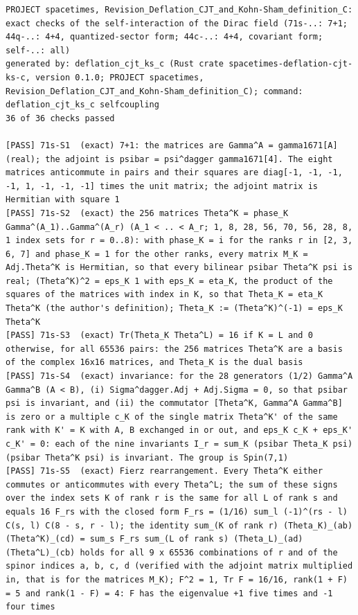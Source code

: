 \documentclass[
  10pt,
]{article}
\begin{document}
\begin{verbatim}
PROJECT spacetimes, Revision_Deflation_CJT_and_Kohn-Sham_definition_C: exact checks of the self-interaction of the Dirac field (71s-..: 7+1; 44q-..: 4+4, quantized-sector form; 44c-..: 4+4, covariant form; self-..: all)
generated by: deflation_cjt_ks_c (Rust crate spacetimes-deflation-cjt-ks-c, version 0.1.0; PROJECT spacetimes, Revision_Deflation_CJT_and_Kohn-Sham_definition_C); command: deflation_cjt_ks_c selfcoupling
36 of 36 checks passed

[PASS] 71s-S1  (exact) 7+1: the matrices are Gamma^A = gamma1671[A] (real); the adjoint is psibar = psi^dagger gamma1671[4]. The eight matrices anticommute in pairs and their squares are diag[-1, -1, -1, -1, 1, -1, -1, -1] times the unit matrix; the adjoint matrix is Hermitian with square 1
[PASS] 71s-S2  (exact) the 256 matrices Theta^K = phase_K Gamma^(A_1)..Gamma^(A_r) (A_1 < .. < A_r; 1, 8, 28, 56, 70, 56, 28, 8, 1 index sets for r = 0..8): with phase_K = i for the ranks r in [2, 3, 6, 7] and phase_K = 1 for the other ranks, every matrix M_K = Adj.Theta^K is Hermitian, so that every bilinear psibar Theta^K psi is real; (Theta^K)^2 = eps_K 1 with eps_K = eta_K, the product of the squares of the matrices with index in K, so that Theta_K = eta_K Theta^K (the author's definition); Theta_K := (Theta^K)^(-1) = eps_K Theta^K
[PASS] 71s-S3  (exact) Tr(Theta_K Theta^L) = 16 if K = L and 0 otherwise, for all 65536 pairs: the 256 matrices Theta^K are a basis of the complex 16x16 matrices, and Theta_K is the dual basis
[PASS] 71s-S4  (exact) invariance: for the 28 generators (1/2) Gamma^A Gamma^B (A < B), (i) Sigma^dagger.Adj + Adj.Sigma = 0, so that psibar psi is invariant, and (ii) the commutator [Theta^K, Gamma^A Gamma^B] is zero or a multiple c_K of the single matrix Theta^K' of the same rank with K' = K with A, B exchanged in or out, and eps_K c_K + eps_K' c_K' = 0: each of the nine invariants I_r = sum_K (psibar Theta_K psi)(psibar Theta^K psi) is invariant. The group is Spin(7,1)
[PASS] 71s-S5  (exact) Fierz rearrangement. Every Theta^K either commutes or anticommutes with every Theta^L; the sum of these signs over the index sets K of rank r is the same for all L of rank s and equals 16 F_rs with the closed form F_rs = (1/16) sum_l (-1)^(rs - l) C(s, l) C(8 - s, r - l); the identity sum_(K of rank r) (Theta_K)_(ab) (Theta^K)_(cd) = sum_s F_rs sum_(L of rank s) (Theta_L)_(ad) (Theta^L)_(cb) holds for all 9 x 65536 combinations of r and of the spinor indices a, b, c, d (verified with the adjoint matrix multiplied in, that is for the matrices M_K); F^2 = 1, Tr F = 16/16, rank(1 + F) = 5 and rank(1 - F) = 4: F has the eigenvalue +1 five times and -1 four times

\end{verbatim}
\end{document}
